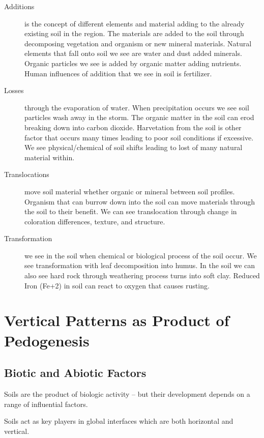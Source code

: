 \begin{description}
	\item[Additions] is the concept of different elements and material adding to the already existing soil in the region. The materials are added to the soil through decomposing vegetation and organism or new mineral materials.  Natural elements that fall onto soil we see are water and dust added minerals. Organic particles we see is added by organic matter adding nutrients. Human influences of addition that we see in soil is fertilizer. 

\item[Losses] through the evaporation of water. When precipitation occurs we see soil particles wash away in the storm. The organic matter in the soil can erod breaking down into carbon dioxide.  Harvetation from the soil is other factor that occurs many times leading to poor soil conditions if excessive. We see physical/chemical of soil shifts leading to lost of many natural material within. 

\item[Translocations] move soil material whether organic or mineral between soil profiles. Organism that can burrow down into the soil can move materials through the soil to their benefit. We can see translocation through change in coloration differences, texture, and structure.

\item[Transformation] we see in the soil when chemical or biological process of the soil occur. We see transformation with leaf decomposition into humus. In the soil we can also see hard rock through weathering process turns into soft clay. Reduced Iron (Fe+2) in soil can react to oxygen that causes rusting.

\end{description}

\section[Pedogenesis]{Vertical Patterns as Product of Pedogenesis}

\subsection{Biotic and Abiotic Factors}

Soils are the product of biologic activity -- but their development depends on a range of influential factors. 


Soils act as key players in global interfaces which are both horizontal and vertical. 

